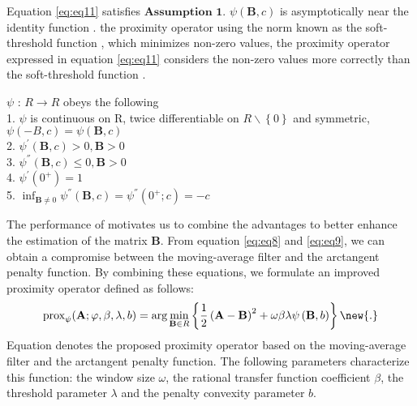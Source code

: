 Equation \ref{eq:eq11} satisfies  $\mathbf{Assumption}$ $\mathbf{1}$. $\psi\left(\mathbf{B},{c} \right)$ is asymptotically near the identity function \citep{selesnick2014sparse}.  the proximity operator using the norm known as the soft-threshold function \citep{donoho1995noising}, which minimizes non-zero values, the proximity operator expressed in equation \ref{eq:eq11} considers the non-zero values more correctly than the soft-threshold function \citep{parekh2017improved}.

\begin{Assumption}
$\psi$ : $R \rightarrow R $ obeys the following\\
	1. $\psi$ is continuous on R, twice differentiable on $R\backslash\left\lbrace 0\right\rbrace$ and symmetric,  $\psi\left(-B,c \right) = \psi\left(\mathbf{B},c \right)$\\
	2. $ \psi^{'}\left(\mathbf{B},c \right)>0, \mathbf{B}>0 $\\	
	3. $ \psi^{''}\left(\mathbf{B},c \right)\leq 0, \mathbf{B}>0 $\\	
	4. $ \psi^{'}\left(0^{+}\right) = 1 $\\
	5. $\inf_{\mathbf{B}\neq 0}\psi^{''}\left(\mathbf{B},c \right)= \psi^{''}\left( 0^{+};c \right)=-c$
\end{Assumption}

The performance of  motivates us to combine the advantages to better enhance the estimation of the matrix $\mathbf{B}$. From equation \ref{eq:eq8} and \ref{eq:eq9}, we can obtain a compromise between the moving-average filter and the arctangent penalty function. By combining these equations, we formulate an improved proximity operator defined as follows:
\begin{align}
\textrm{prox}_{\psi}(\mathbf{A};\varphi,\beta,\lambda,{b}) = \textrm{arg}\min_{\mathbf{B} \in R}\left\lbrace \frac{1}{2}\left(\mathbf{A}-\mathbf{B} \right)^2 +\omega\beta\lambda\psi\left( \mathbf{B},{b} \right)\right\rbrace\dlo{,}\new{.}
\label{eq:eq12}
\end{align}		
Equation \dlo{\ref{eq:eq11}}\wen{\ref{eq:eq12}} denotes the proposed proximity operator based on the moving-average filter and the arctangent penalty function. The following parameters characterize this function: the window size $\omega$, the rational transfer function coefficient $\beta$, the threshold parameter $\lambda$ and the penalty convexity parameter ${b}$. 

